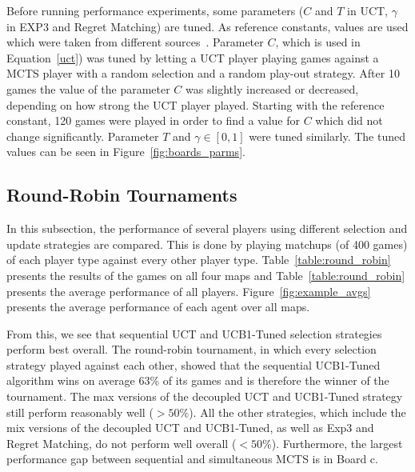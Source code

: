 \documentclass{article}
\begin{document}
Before running performance experiments, some parameters ($C$ and $T$ in UCT, $\gamma$ in EXP3 and Regret Matching) are tuned. 
As reference constants, values are used which were taken from different sources~\cite{teuling_tron,cig_paper}. Parameter $C$, which is used in Equation~\ref{uct}) was tuned by letting a UCT player playing games against a MCTS player with a random selection and a random play-out strategy. 
After 10 games the value of the parameter $C$ was slightly increased or decreased, depending on how strong the UCT player played. 
Starting with the reference constant, 120 games were played in order to find a value for $C$ which did not change significantly.
Parameter $T$ and $\gamma \in [0,1]$ were tuned similarly.
The tuned values can be seen in Figure~\ref{fig:boards_parms}.

\subsection{Round-Robin Tournaments}
\label{subsec:round_robin}
In this subsection, the performance of several players using different selection and update strategies are compared. 
This is done by playing matchups (of 400 games) of each player type against every other player type. 
Table~\ref{table:round_robin} presents the results of the games on all four maps and Table~\ref{table:round_robin} presents the average
performance of all players.
Figure~\ref{fig:example_avgs} presents the average performance of each agent over all maps. 

From this, we see that sequential UCT and UCB1-Tuned selection strategies perform best overall.
The round-robin tournament, in which every selection strategy played against each other, showed that the sequential UCB1-Tuned algorithm wins on average 63\% of its games and is therefore the winner of the tournament. 
The max versions of the decoupled UCT and UCB1-Tuned strategy still perform reasonably well ($>50\%$). 
All the other strategies, which include the mix versions of the decoupled UCT and UCB1-Tuned, as well as 
Exp3 and Regret Matching, do not perform well overall ($<50\%$).
Furthermore, the largest performance gap between sequential and simultaneous MCTS is in Board c. 
\end{document}
